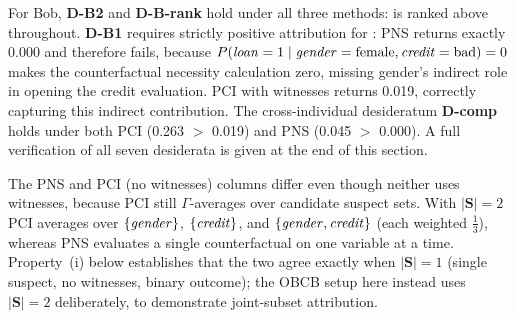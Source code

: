 For Bob, \textbf{D-B2} and \textbf{D-B-rank} hold under all three methods:
 is ranked above  throughout. \textbf{D-B1} requires
strictly positive attribution for : PNS returns exactly 0.000 and
therefore fails, because $P(\varname{loan}=1\mid\varname{gender}=\text{female},
\varname{credit}=\text{bad})=0$ makes the counterfactual necessity calculation zero,
missing gender's indirect role in opening the credit evaluation. PCI with witnesses
returns 0.019, correctly capturing this indirect contribution. The cross-individual
desideratum \textbf{D-comp} holds under both PCI (0.263 $>$ 0.019) and PNS
(0.045 $>$ 0.000). A full verification of all seven desiderata is given at the end
of this section.

The PNS and PCI (no witnesses) columns differ even though neither uses witnesses,
because PCI still $\Gamma$-averages over candidate suspect sets.  With
$|\mathbf{S}|=2$ PCI averages over $\{\varname{gender}\}$, $\{\varname{credit}\}$,
and $\{\varname{gender},\varname{credit}\}$ (each weighted $\tfrac{1}{3}$),
whereas PNS evaluates a single counterfactual on one variable at a time.
Property~(i) below establishes that the two agree exactly when $|\mathbf{S}|=1$
(single suspect, no witnesses, binary outcome); the OBCB setup here instead uses
$|\mathbf{S}|=2$ deliberately, to demonstrate joint-subset attribution.



